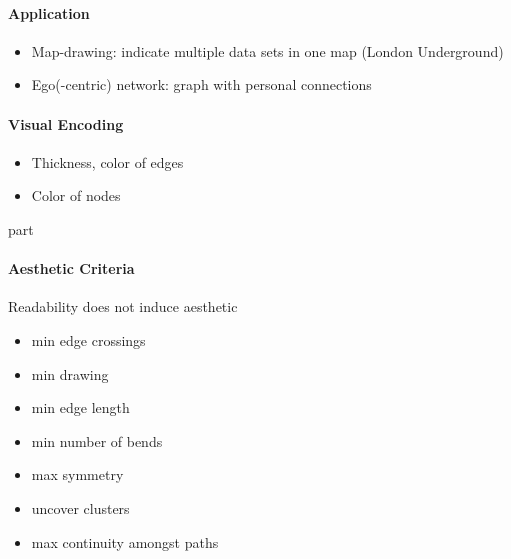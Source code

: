 \documentclass[10pt,a4paper]{article}
\begin{document}
	\paragraph{Application}
	\begin{itemize}
		\item Map-drawing: indicate multiple data sets in one map (London Underground)
		\item Ego(-centric) network: graph with personal connections 
	\end{itemize}
	
	\paragraph{Visual Encoding}
	\begin{itemize}
		\item Thickness, color of edges
		\item Color of nodes
	\end{itemize}
	part
	\paragraph{Aesthetic Criteria}
	Readability does not induce aesthetic
	\begin{itemize}
		\item min edge crossings
		\item min drawing
		\item min edge length
		\item min number of bends
		\item max symmetry
		\item uncover clusters
		\item max continuity amongst paths
	\end{itemize}
	
\end{document}
